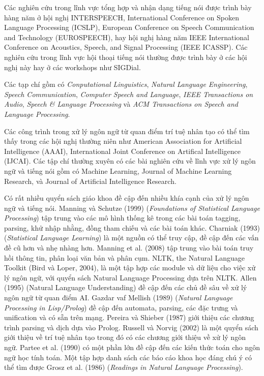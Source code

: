 Các nghiên cứu trong lĩnh vực tổng hợp và nhận dạng tiếng nói được trình bày hàng năm ở hội nghị INTERSPEECH, International Conference on Spoken Language Processing (ICSLP), European Conference on Speech Communication and Technology (EUROSPEECH), hay hội nghị hàng năm IEEE International Conference on Acoustics, Speech, and Signal Processing (IEEE ICASSP). Các nghiên cứu trong lĩnh vực hội thoại tiếng nói thường được trình bày ở các hội nghị này hay ở các workshops như SIGDial.

Các tạp chí gồm có \textit{Conputational Linguistics}, \textit{Natural Language Engineering}, \textit{Speech Communication}, \textit{Computer Speech and Language}, \textit{IEEE Transactions on Audio}, \textit{Speech & Language Processing} và \textit{ACM Transactions on Speech and Language Processing}.

Các công trình trong xử lý ngôn ngữ từ quan điểm trí tuệ nhân tạo có thể tìm thấy trong các hội nghị thường niên như American Association for Artificial Intelligence (AAAI), International Joint Conference on Artifical Intelligence (IJCAI). Các tập chí thường xuyên có các bài nghiên cứu về lĩnh vực xử lý ngôn ngữ và tiếng nói gồm có Machine Learning, Journal of Machine Learning Research, và Journal of Artificial Intelligence Research.

Có rất nhiều quyển sách giáo khoa đề cập đến nhiều khía cạnh của xử lý ngôn ngữ và tiếng nói. Manning và Schutze (1999) (\textit{Foundations of Statistical Language Processing}) tập trung vào các mô hình thống kê trong các bài toán tagging, parsing, khử nhập nhằng, đồng tham chiếu và các bài toán khác. Charniak (1993) (\textit{Statistical Language Learning}) là một nguồn có thể truy cập, đề cập đến các vấn đề cũ hơn và nhẹ nhàng hơn. Manning et al. (2008) tập trung vào bài toán truy hồi thông tin, phân loại văn bản và phân cụm. NLTK, the Natural Language Toolkit (Bird và Loper, 2004), là một tập hợp các module và dữ liệu cho việc xử lý ngôn ngữ, với quyển sách Natural Language Processing dựa trên NLTK. Allen (1995) (Natural Language Understanding) đề cập đến các chủ đề sâu về xử lý ngôn ngữ từ quan điểm AI. Gazdar vaf Mellish (1989) (\textit{Natural Language Processing in Lisp/Prolog}) đề cập đến automata, parsing, các đặc trưng và unification và có sẵn trên mạng. Pereira và Shieber (1987) giới thiệu các chương trình parsing và dịch dựa vào Prolog. Russell và Norvig (2002) là một quyển sách giới thiệu về trí tuệ nhân tạo trong đó có các chương giới thiệu về xử lý ngôn ngữ. Partee et al. (1990) có một phần lớn đề cập đến các kiến thức toán cho ngôn ngữ học tính toán. Một tập hợp danh sách các báo cáo khoa học đáng chú ý có thể tìm được Grosz et al. (1986) (\textit{Readings in Natural Language Processing}).

